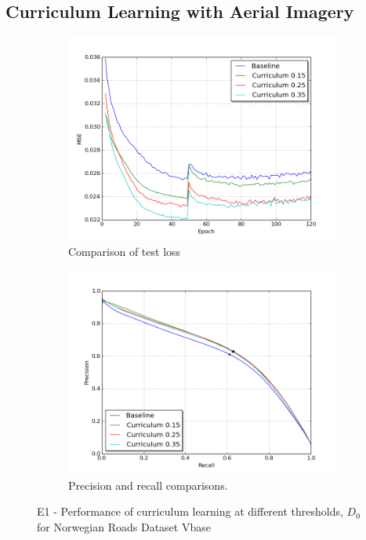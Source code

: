 \subsection{Curriculum Learning with Aerial Imagery}
\label{sec:results_curriculum_learning_aerial_imagery}

\begin{figure}[!h]
\begin{subfigure}{0.5\textwidth}
\includegraphics[width=\linewidth]{figs/E1/E1-lc.png}
\caption{Comparison of test loss} \label{fig:E5_curr_norway_loss}
\end{subfigure}
\hspace*{\fill} %
\begin{subfigure}{0.5\textwidth}
\includegraphics[width=\linewidth]{figs/E1/E1-pr.png}
\caption{Precision and recall comparisons.} \label{fig:E5_curr_norway_pr}
\end{subfigure}
\hspace*{\fill} %
\caption[E1 - Performance of curriculum learning for Norwegian Roads Dataset Vbase]{E1 - Performance of curriculum learning at different thresholds, $D_{0}$ for Norwegian Roads Dataset Vbase} \label{fig:E5_curriculum_norway}
\end{figure}

